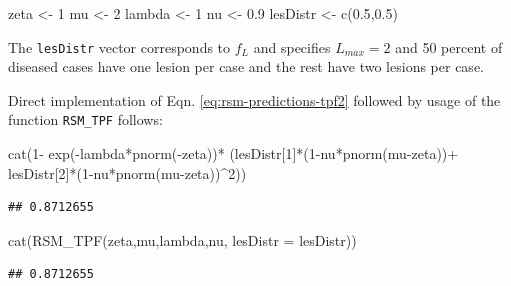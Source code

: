\documentclass[
]{book}
\newenvironment{Shaded}{\begin{snugshade}}{\end{snugshade}}
\newcommand{\AttributeTok}[1]{\textcolor[rgb]{0.77,0.63,0.00}{#1}}
\newcommand{\DecValTok}[1]{\textcolor[rgb]{0.00,0.00,0.81}{#1}}
\newcommand{\FloatTok}[1]{\textcolor[rgb]{0.00,0.00,0.81}{#1}}
\newcommand{\FunctionTok}[1]{\textcolor[rgb]{0.00,0.00,0.00}{#1}}
\newcommand{\NormalTok}[1]{#1}
\newcommand{\OtherTok}[1]{\textcolor[rgb]{0.56,0.35,0.01}{#1}}
\newcommand{\SpecialCharTok}[1]{\textcolor[rgb]{0.00,0.00,0.00}{#1}}
\begin{document}
\begin{Shaded}
\begin{Highlighting}[]
\NormalTok{zeta }\OtherTok{\textless{}{-}} \DecValTok{1}
\NormalTok{mu }\OtherTok{\textless{}{-}} \DecValTok{2}
\NormalTok{lambda }\OtherTok{\textless{}{-}} \DecValTok{1}
\NormalTok{nu }\OtherTok{\textless{}{-}} \FloatTok{0.9}
\NormalTok{lesDistr }\OtherTok{\textless{}{-}} \FunctionTok{c}\NormalTok{(}\FloatTok{0.5}\NormalTok{,}\FloatTok{0.5}\NormalTok{)}
\end{Highlighting}
\end{Shaded}

The \texttt{lesDistr} vector corresponds to \(f_L\) and specifies \(L_{max} = 2\) and 50 percent of diseased cases have one lesion per case and the rest have two lesions per case.

Direct implementation of Eqn. \eqref{eq:rsm-predictions-tpf2} followed by usage of the function \texttt{RSM\_TPF} follows:

\begin{Shaded}
\begin{Highlighting}[]
\FunctionTok{cat}\NormalTok{(}\DecValTok{1}\SpecialCharTok{{-}}
\FunctionTok{exp}\NormalTok{(}\SpecialCharTok{{-}}\NormalTok{lambda}\SpecialCharTok{*}\FunctionTok{pnorm}\NormalTok{(}\SpecialCharTok{{-}}\NormalTok{zeta))}\SpecialCharTok{*}
\NormalTok{(lesDistr[}\DecValTok{1}\NormalTok{]}\SpecialCharTok{*}\NormalTok{(}\DecValTok{1}\SpecialCharTok{{-}}\NormalTok{nu}\SpecialCharTok{*}\FunctionTok{pnorm}\NormalTok{(mu}\SpecialCharTok{{-}}\NormalTok{zeta))}\SpecialCharTok{+}
\NormalTok{lesDistr[}\DecValTok{2}\NormalTok{]}\SpecialCharTok{*}\NormalTok{(}\DecValTok{1}\SpecialCharTok{{-}}\NormalTok{nu}\SpecialCharTok{*}\FunctionTok{pnorm}\NormalTok{(mu}\SpecialCharTok{{-}}\NormalTok{zeta))}\SpecialCharTok{\^{}}\DecValTok{2}\NormalTok{))}
\end{Highlighting}
\end{Shaded}

\begin{verbatim}
## 0.8712655
\end{verbatim}

\begin{Shaded}
\begin{Highlighting}[]
\FunctionTok{cat}\NormalTok{(}\FunctionTok{RSM\_TPF}\NormalTok{(zeta,mu,lambda,nu, }\AttributeTok{lesDistr =}\NormalTok{ lesDistr))}
\end{Highlighting}
\end{Shaded}

\begin{verbatim}
## 0.8712655
\end{verbatim}
\end{document}

